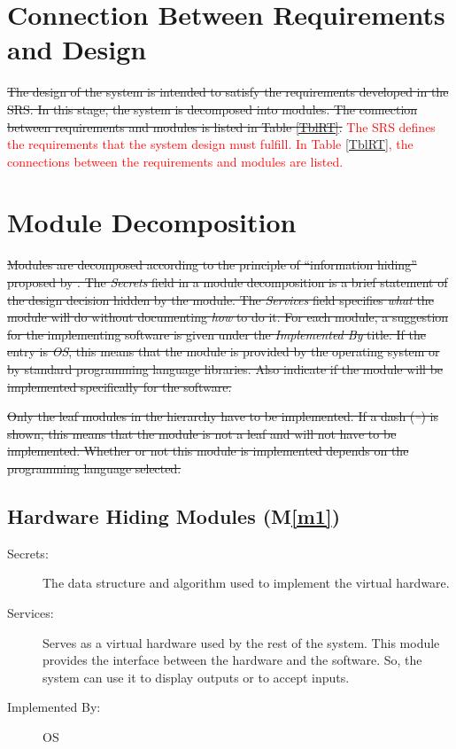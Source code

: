 \documentclass[12pt, titlepage]{article}
\newcommand{\mref}[1]{M\ref{#1}}
\begin{document}
\section{Connection Between Requirements and Design} \label{SecConnection}

\sout{The design of the system is intended to satisfy the requirements developed in the SRS. In this stage, the system is decomposed into modules. The connection between requirements and modules is listed in Table \ref{TblRT}.}
\textcolor{red}{The SRS defines the requirements that the system design must fulfill. In Table \ref{TblRT}, the connections between the requirements and modules are listed.}

\section{Module Decomposition} \label{SecMD}
\sout{Modules are decomposed according to the principle of ``information hiding'' proposed by \mbox{\citet{ParnasEtAl1984}}. The \emph{Secrets} field in a module decomposition is a brief statement of the design decision hidden by the module. The \emph{Services} field specifies \emph{what} the module will do without documenting \emph{how} to do it. For each module, a suggestion for the implementing software is given under the \emph{Implemented By} title. If the entry is \emph{OS}, this means that the module is provided by the operating system or by standard programming language libraries.  Also indicate if the module will be implemented specifically for the software.}

\sout{Only the leaf modules in the hierarchy have to be implemented. If a dash (\emph{--}) is shown, this means that the module is not a leaf and will not have to be implemented. Whether or not this module is implemented depends on the programming language selected.}

\subsection{Hardware Hiding Modules (\mref{m1})}
\begin{description}
    \item[Secrets:] The data structure and algorithm used to implement the virtual hardware.
    \item[Services:] Serves as a virtual hardware used by the rest of the system. This module provides the interface between the hardware and the software. So, the system can use it to display outputs or to accept inputs.
    \item[Implemented By:] OS
\end{description}
\end{document}
